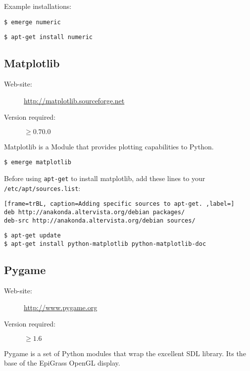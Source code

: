 Example installations:
\begin{lstlisting}[frame=trBL, caption=Installing Numeric python on Gentoo GNU/Linux ,label=lst:instnumpyg]
$ emerge numeric
\end{lstlisting}
\begin{lstlisting}[frame=trBL, caption=Installing Numeric python on Debian GNU/Linux ,label=lst:instnumpyd]
$ apt-get install numeric
\end{lstlisting}

\subsection{Matplotlib}
\begin{description}
\item[Web-site:] \url{http://matplotlib.sourceforge.net}
\item[Version required:] $\geq0.70.0$
\end{description}
Matplotlib is a Module that provides plotting capabilities to Python.
\begin{lstlisting}[frame=trBL, caption=Installing Matplotlib on Gentoo GNU/Linux ,label=lst:instmplg]
$ emerge matplotlib
\end{lstlisting}
Before using \texttt{apt-get} to install matplotlib, add these lines to your  \texttt{/etc/apt/sources.list}:
\begin{lstlisting}[frame=trBL, caption=Adding specific sources to apt-get. ,label=]
deb http://anakonda.altervista.org/debian packages/
deb-src http://anakonda.altervista.org/debian sources/
\end{lstlisting}
\begin{lstlisting}[frame=trBL, caption=Installing Matplotlib on Debian GNU/Linux ,label=lst:instmpld]
$ apt-get update
$ apt-get install python-matplotlib python-matplotlib-doc
\end{lstlisting}


\subsection{Pygame}
\begin{description}
\item[Web-site:] \url{http://www.pygame.org}
\item[Version required:] $\geq1.6$
\end{description}
Pygame is a set of Python modules that wrap the excellent SDL library. Its the base of the EpiGrass OpenGL display.

